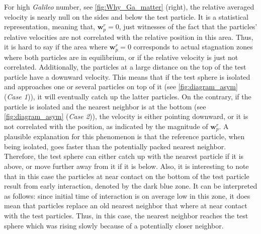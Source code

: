 

For high \textit{Galileo} number, see \ref{fig:Why_Ga_matter} (right), the relative averaged velocity is nearly null on the sides and below the test particle. 
It is a statistical representation, meaning that, $\textbf{w}_p^r = 0$, just witnesses of the fact that the particles' relative velocities are not correlated with the relative position in this area. 
Thus, it is hard to say if the area where $\textbf{w}_p^r = 0$ corresponds to actual stagnation zones where both particles are in equilibrium, or if the relative velocity is just not correlated. 
Additionally, the particles at a large distance on the top of the test particle have a downward velocity. 
This means that if the test sphere is isolated and approaches one or several  particles on top of it (see \ref{fig:diagram_asym} (\textit{Case 1})), it will eventually catch up the latter particles. 
On the contrary, if the particle is isolated and the nearest neighbor is at the bottom (see \ref{fig:diagram_asym} (\textit{Case 2})), the velocity is either pointing downward, or it is not correlated with the position, as indicated by the magnitude of $\textbf{w}_p^r$. 
A plausible explanation for this phenomenon is that the reference particle, when being isolated, goes faster than the potentially packed nearest neighbor.
Therefore, the test sphere can either catch up with the nearest particle if it is above, or move further away from it if it is below.
Also, it is interesting to note that in this case the particles at near contact on the bottom of the test particle result from early interaction, denoted by the dark blue zone. 
It can be interpreted as follows: since 
initial time of interaction is on average low in this zone, it does mean that particles replace an old nearest neighbor that where at near contact with the test particles. 
Thus, in this case, the nearest neighbor reaches the test sphere which was rising slowly because of a potentially closer neighbor. 

